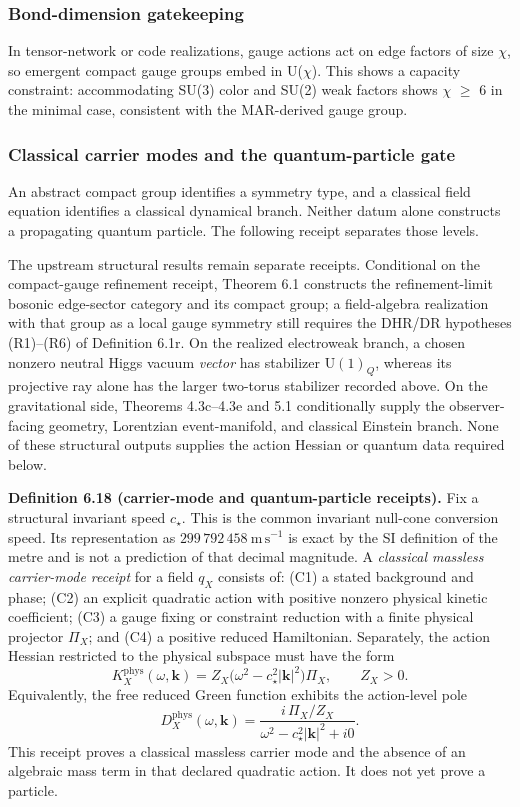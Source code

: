 \subsubsection{Bond-dimension gatekeeping}\label{610-bond-dimension-gatekeeping}

In tensor-network or code realizations, gauge actions act on edge factors of size \ensuremath{\chi}, so emergent compact gauge groups embed in U(\ensuremath{\chi}). This shows a capacity constraint: accommodating SU(3) color and SU(2) weak factors shows \ensuremath{\chi} \ensuremath{\geq} 6 in the minimal case, consistent with the MAR-derived gauge group.

\subsubsection{Classical carrier modes and the quantum-particle gate}\label{611-classical-carrier-modes-and-quantum-particle-gate}

An abstract compact group identifies a symmetry type, and a classical field equation identifies a
classical dynamical branch. Neither datum alone constructs a propagating quantum particle. The
following receipt separates those levels.

The upstream structural results remain separate receipts. Conditional on the compact-gauge
refinement receipt, Theorem 6.1 constructs the refinement-limit bosonic edge-sector category and
its compact group; a field-algebra realization with that group as a local gauge symmetry still
requires the DHR/DR hypotheses (R1)--(R6) of Definition 6.1r. On the realized electroweak branch,
a chosen nonzero neutral Higgs vacuum \emph{vector} has stabilizer
\(\mathrm U(1)_Q\), whereas its projective ray alone has the larger two-torus stabilizer recorded
above. On the gravitational side, Theorems 4.3c--4.3e and 5.1 conditionally supply the
observer-facing geometry, Lorentzian event-manifold, and classical Einstein branch. None of these
structural outputs supplies the action Hessian or quantum data required below.

\textbf{Definition 6.18 (carrier-mode and quantum-particle receipts).} Fix a structural invariant
speed \(c_\star\). This is the common invariant null-cone conversion speed. Its representation as
\(299\,792\,458\ \mathrm{m\,s^{-1}}\) is exact by the SI definition of the metre and is not a
prediction of that decimal magnitude. A \emph{classical massless carrier-mode receipt} for a
field \(q_X\) consists
of: (C1) a stated background and phase; (C2) an explicit quadratic action with positive nonzero
physical kinetic coefficient; (C3) a gauge fixing or constraint reduction with a finite physical projector
\(\Pi_X\); and (C4) a positive reduced Hamiltonian. Separately, the action Hessian restricted to
the physical subspace must have the form
\[
K_X^{\mathrm{phys}}(\omega,\mathbf k)
=Z_X\bigl(\omega^2-c_\star^2|\mathbf k|^2\bigr)\Pi_X,
\qquad Z_X>0.
\]
Equivalently, the free reduced Green function exhibits the action-level pole
\[
D_X^{\mathrm{phys}}(\omega,\mathbf k)
=\frac{i\,\Pi_X/Z_X}
{\omega^2-c_\star^2|\mathbf k|^2+i0}.
\]
This receipt proves a classical massless carrier mode and the absence of an algebraic mass term in
that declared quadratic action. It does not yet prove a particle.

